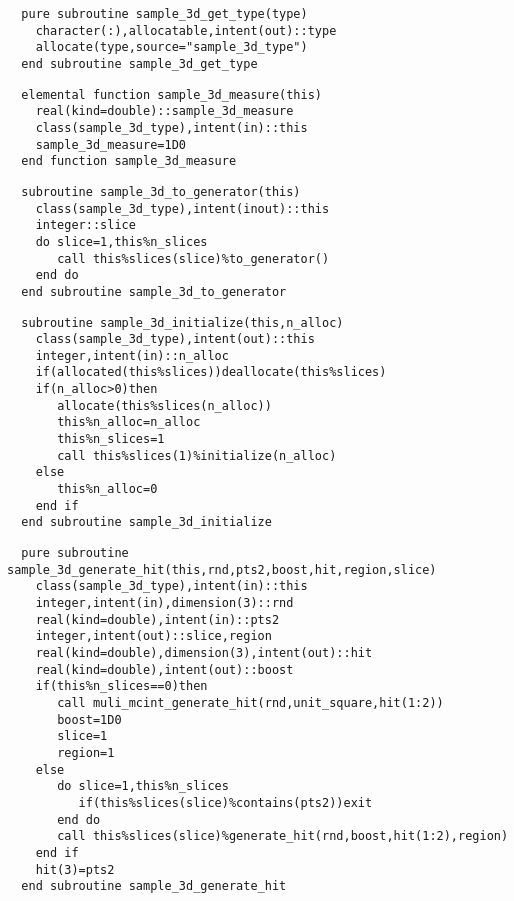 \begin{Verbatim}
  pure subroutine sample_3d_get_type(type)
    character(:),allocatable,intent(out)::type
    allocate(type,source="sample_3d_type")
  end subroutine sample_3d_get_type
\end{Verbatim}

\begin{Verbatim}
  elemental function sample_3d_measure(this)
    real(kind=double)::sample_3d_measure
    class(sample_3d_type),intent(in)::this
    sample_3d_measure=1D0
  end function sample_3d_measure
\end{Verbatim}

\begin{Verbatim}
  subroutine sample_3d_to_generator(this)
    class(sample_3d_type),intent(inout)::this
    integer::slice
    do slice=1,this%n_slices
       call this%slices(slice)%to_generator()
    end do
  end subroutine sample_3d_to_generator
\end{Verbatim}

\begin{Verbatim}
  subroutine sample_3d_initialize(this,n_alloc)
    class(sample_3d_type),intent(out)::this
    integer,intent(in)::n_alloc
    if(allocated(this%slices))deallocate(this%slices)
    if(n_alloc>0)then
       allocate(this%slices(n_alloc))
       this%n_alloc=n_alloc
       this%n_slices=1
       call this%slices(1)%initialize(n_alloc)
    else
       this%n_alloc=0
    end if
  end subroutine sample_3d_initialize
\end{Verbatim}

\begin{Verbatim}
  pure subroutine sample_3d_generate_hit(this,rnd,pts2,boost,hit,region,slice)
    class(sample_3d_type),intent(in)::this
    integer,intent(in),dimension(3)::rnd
    real(kind=double),intent(in)::pts2
    integer,intent(out)::slice,region
    real(kind=double),dimension(3),intent(out)::hit
    real(kind=double),intent(out)::boost
    if(this%n_slices==0)then
       call muli_mcint_generate_hit(rnd,unit_square,hit(1:2))
       boost=1D0
       slice=1
       region=1
    else
       do slice=1,this%n_slices
          if(this%slices(slice)%contains(pts2))exit          
       end do
       call this%slices(slice)%generate_hit(rnd,boost,hit(1:2),region)
    end if
    hit(3)=pts2
  end subroutine sample_3d_generate_hit
\end{Verbatim}

